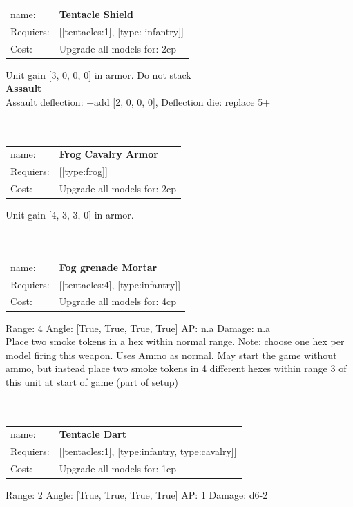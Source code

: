 \ \\
\ \\
\begin{tabular}{ll}
name: & {\bf Tentacle Shield } \\
Requiers: & [[tentacles:1], [type: infantry]] \\
Cost: & Upgrade all models for: 2cp \\
\end{tabular}

Unit gain [3, 0, 0, 0] in armor. Do not stack\\ 




{\bf Assault} \ \\
Assault deflection: +add [2, 0, 0, 0], Deflection die: replace 5+
\\ 




\ \\
\ \\
\begin{tabular}{ll}
name: & {\bf Frog Cavalry Armor } \\
Requiers: & [[type:frog]] \\
Cost: & Upgrade all models for: 2cp \\
\end{tabular}

Unit gain [4, 3, 3, 0] in armor.\\ 









\ \\
\ \\
\begin{tabular}{ll}
name: & {\bf Fog grenade Mortar } \\
Requiers: & [[tentacles:4], [type:infantry]] \\
Cost: & Upgrade all models for: 4cp \\
\end{tabular}



Range: 4  Angle: [True, True, True, True] AP: n.a Damage: n.a \\
Place two smoke tokens in a hex within normal range. Note: choose one hex per model firing this weapon. Uses Ammo as normal. May start the game without ammo, but instead place two smoke tokens in 4 different hexes within range 3 of this unit at start of game (part of setup)\\ 








\ \\
\ \\
\begin{tabular}{ll}
name: & {\bf Tentacle Dart } \\
Requiers: & [[tentacles:1], [type:infantry, type:cavalry]] \\
Cost: & Upgrade all models for: 1cp \\
\end{tabular}



Range: 2  Angle: [True, True, True, True] AP: 1 Damage: d6-2 \\








\ \\
